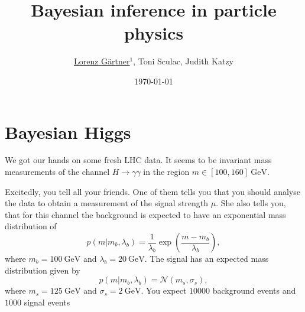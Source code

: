\documentclass{article}
\title{Bayesian inference in particle physics}
\author{\underline{Lorenz G\"artner}$^{1}$, Toni Sculac, Judith Katzy }
\date{\today}
\begin{document}
\maketitle


\section{Bayesian Higgs}
We got our hands on some fresh LHC data. It seems to be invariant mass measurements of the channel $H\to \gamma \gamma$ in the region $m \in [100, 160]~\mathrm{GeV}$.

Excitedly, you tell all your friends. One of them tells you that you should analyse the data to obtain a measurement of the signal strength $\mu$. She also tells you, that for this channel the background is expected to have an exponential mass distribution of
$$p(m|m_b, \lambda_b) =\frac{1}{\lambda_b} \exp\left(\frac{m-m_b}{\lambda_b}\right),$$
where $m_b=100~\mathrm{GeV}$ and  $\lambda_b=20~\mathrm{GeV}$. The signal has an expected mass distribution given by
$$p(m|m_b, \lambda_b) = \mathcal{N}(m_s, \sigma_s),$$
where $m_s=125~\mathrm{GeV}$ and $\sigma_s=2~\mathrm{GeV}$. You expect $10000$ background events and $1000$ signal events
\end{document}
